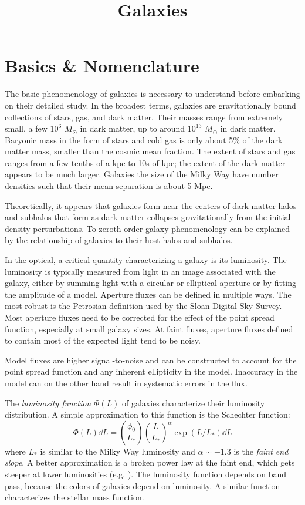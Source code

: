 \title{\bf Galaxies}

\section{Basics \& Nomenclature}

The basic phenomenology of galaxies is necessary to understand before
embarking on their detailed study. In the broadest terms, galaxies are
gravitationally bound collections of stars, gas, and dark
matter. Their masses range from extremely small, a few $10^6$
$M_\odot$ in dark matter, up to around $10^{13}$ $M_\odot$ in dark
matter. Baryonic mass in the form of stars and cold gas is only about
5\% of the dark matter mass, smaller than the cosmic mean
fraction. The extent of stars and gas ranges from a few tenths of a
kpc to 10s of kpc; the extent of the dark matter appears to be much
larger. Galaxies the size of the Milky Way have number densities such
that their mean separation is about 5 Mpc.

Theoretically, it appears that galaxies form near the centers of dark
matter halos and subhalos that form as dark matter collapses
gravitationally from the initial density perturbations. To zeroth
order galaxy phenomenology can be explained by the relationship of
galaxies to their host halos and subhalos.

In the optical, a critical quantity characterizing a galaxy is its
luminosity. The luminosity is typically measured from light in an
image associated with the galaxy, either by summing light with a
circular or elliptical aperture or by fitting the amplitude of a
model. Aperture fluxes can be defined in multiple ways. The most
robust is the Petrosian definition used by the Sloan Digital Sky
Survey. Most aperture fluxes need to be corrected for the effect of
the point spread function, especially at small galaxy sizes. At faint
fluxes, aperture fluxes defined to contain most of the expected light
tend to be noisy.

Model fluxes are higher signal-to-noise and can be constructed to
account for the point spread function and any inherent ellipticity in
the model. Inaccuracy in the model can on the other hand result in
systematic errors in the flux.

The {\it luminosity function} $\Phi(L)$ of galaxies characterize their
luminosity distribution.  A simple approximation to this function is
the Schechter function:
\begin{equation}
\Phi(L) \dd{L} = \left(\frac{\phi_0}{L_\ast}\right)
\left(\frac{L}{L_\ast}\right)^\alpha \exp\left(L / L_\ast\right)
\dd{L}
\end{equation}
where $L_\ast$ is similar to the Milky Way luminosity and $\alpha \sim
-1.3$ is the {\it faint end slope}. A better approximation is a broken
power law at the faint end, which gets steeper at lower luminosities
(e.g. \citealt{blanton04b}). The luminosity function depends on band
pass, because the colors of galaxies depend on luminosity. A similar
function characterizes the stellar mass function.

